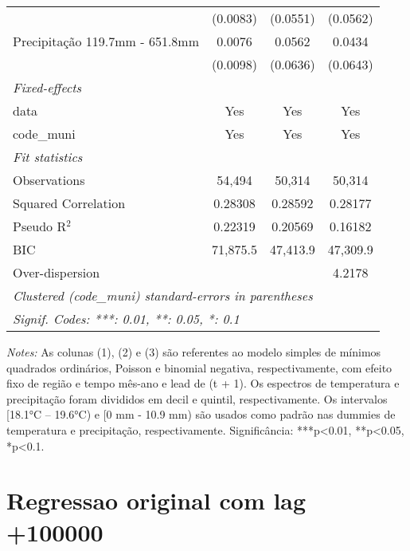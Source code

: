 \documentclass[
]{article}
\begin{document}
\begin{table}[htbp]
\begin{tabular}{lccc}
  &(0.0083) & (0.0551) & (0.0562)\\
Precipitação 119.7mm - 651.8mm & 0.0076 & 0.0562 & 0.0434\\
  &(0.0098) & (0.0636) & (0.0643)\\
\midrule \emph{Fixed-effects}&   &   &  \\
data & Yes & Yes & Yes\\
code\_muni & Yes & Yes & Yes\\
\midrule \emph{Fit statistics}&  & & \\
Observations & 54,494&50,314&50,314\\
Squared Correlation & 0.28308&0.28592&0.28177\\
Pseudo R$^2$ & 0.22319&0.20569&0.16182\\
BIC & 71,875.5&47,413.9&47,309.9\\
Over-dispersion & &&4.2178\\
\midrule\midrule\multicolumn{4}{l}{\emph{Clustered (code\_muni) standard-errors in parentheses}}\\
\multicolumn{4}{l}{\emph{Signif. Codes: ***: 0.01, **: 0.05, *: 0.1}}\\
\end{tabular}

\medskip \emph{Notes:} As colunas (1), (2) e (3) são referentes ao modelo simples de mínimos quadrados ordinários, Poisson e binomial negativa, respectivamente, com efeito fixo de região e tempo mês-ano e lead de (t + 1). Os espectros de temperatura e precipitação foram divididos em decil e quintil, respectivamente. Os intervalos [18.1°C – 19.6°C) e [0 mm - 10.9 mm) são usados como padrão nas dummies de temperatura e precipitação, respectivamente. Significância: ***p<0.01, **p<0.05, *p<0.1.
\end{table}

\hypertarget{regressao-original-com-lag-100000}{%
\section{Regressao original com lag
+100000}\label{regressao-original-com-lag-100000}}
\end{document}
